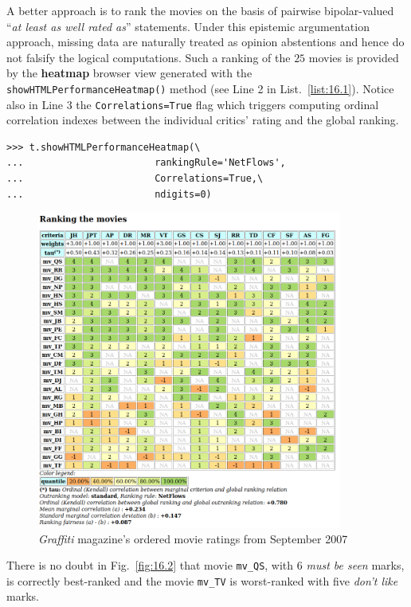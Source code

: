 A better approach is to rank the movies on the basis of pairwise bipolar-valued  ``\emph{at least as well rated as}'' statements. Under this epistemic argumentation approach, missing data are naturally treated as opinion abstentions and hence do not falsify the logical computations. Such a \NetFlows ranking of the $25$ movies is provided by the \textbf{heatmap} browser view generated with the \texttt{showHTMLPerformanceHeatmap()} method (see Line 2 in List.~\vref{list:16.1}). Notice also in Line 3 the \texttt{Correlations=True} flag which triggers computing ordinal correlation indexes between the individual critics' rating and the global \NetFlows ranking.
\begin{lstlisting}[caption={Showing the movie from best to worst rated in a heatmap view},label=list:16.1]
>>> t.showHTMLPerformanceHeatmap(\
...                       rankingRule='NetFlows',
...                       Correlations=True,\
...                       ndigits=0)
\end{lstlisting}
\begin{figure}[h]
\includegraphics[width=10cm]{Figures/graffiti07_2.png}
\caption{\emph{Graffiti} magazine's ordered movie ratings from September 2007}
\label{fig:16.2}       %
\end{figure}
There is no doubt in Fig.~\vref{fig:16.2} that movie \texttt{mv\_QS}, with $6$ \emph{must be seen} marks, is correctly best-ranked and the movie \texttt{mv\_TV} is worst-ranked with five \emph{don't like} marks.

